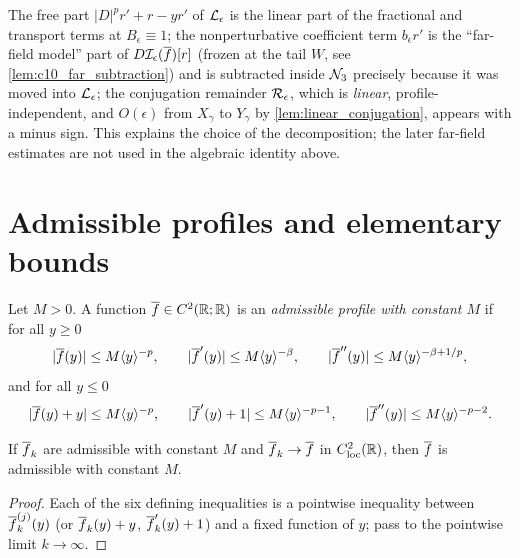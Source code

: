 \begin{remark}
  The free part $|D|^pr'+r-yr'$ of $\mathcal{L}_\epsilon$ is the linear part of the fractional and transport
  terms at $B_\epsilon\equiv1$; the nonperturbative coefficient term $b_\epsilon r'$ is the
  ``far-field model'' part of $D\mathcal{I}_\epsilon(\overline{f})[r]$ (frozen at the tail $W$, see
  \cref{lem:c10_far_subtraction}) and is subtracted inside $\mathcal{N}_3$ precisely because it was moved into
  $\mathcal{L}_\epsilon$; the conjugation remainder $\mathcal{R}_\epsilon$, which is \emph{linear}, profile-independent,
  and $O(\epsilon)$ from $X_\gamma$ to $Y_\gamma$ by \cref{lem:linear_conjugation}, appears with a minus sign.
  This explains the choice of the decomposition; the later far-field estimates are not used in
  the algebraic identity above.
\end{remark}

\section{Admissible profiles and elementary bounds}

\begin{definition}
  \label{def:nonlinear_admissible_profile}
  Let $M>0$. A function $\overline{f}\in C^2(\mathbb{R};\mathbb{R})$ is an \emph{admissible profile with constant $M$} if
  for all $y\ge0$
  \[
    |\overline{f}(y)|\le M\langle y \rangle^{-p},\qquad |\overline{f}'(y)|\le M\langle y \rangle^{-\beta},\qquad
    |\overline{f}''(y)|\le M\langle y \rangle^{-\beta+1/p},
  \]
  and for all $y\le0$
  \[
    |\overline{f}(y)+y|\le M\langle y \rangle^{-p},\qquad |\overline{f}'(y)+1|\le M\langle y \rangle^{-p-1},\qquad
    |\overline{f}''(y)|\le M\langle y \rangle^{-p-2}.
  \]
\end{definition}

\begin{lemma}
  \label{lem:c10_admissible_closed}
  If $\overline{f}_k$ are admissible with constant $M$ and $\overline{f}_k\to\overline{f}$ in $C^2_{\mathrm{loc}}(\mathbb{R})$,
  then $\overline{f}$ is admissible with constant $M$.
\end{lemma}
\begin{proof}
  Each of the six defining inequalities is a pointwise inequality between $\overline{f}_k^{(j)}(y)$ (or
  $\overline{f}_k(y)+y$, $\overline{f}_k'(y)+1$) and a fixed function of $y$; pass to the pointwise limit $k\to\infty$.
\end{proof}

